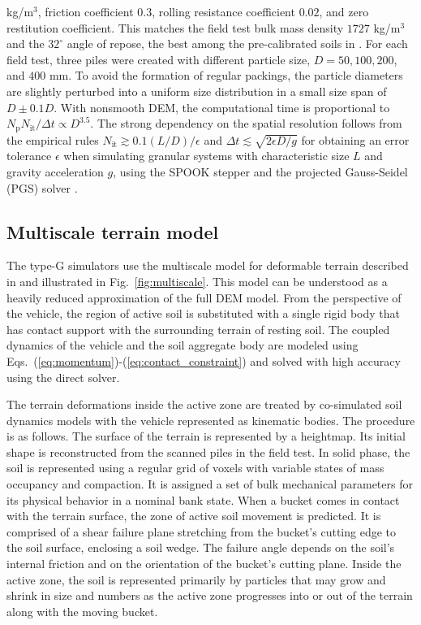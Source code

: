 \documentclass[10pt]{article}
\begin{document}
kg/m$^3$, friction coefficient $0.3$, rolling resistance coefficient $0.02$, and zero restitution coefficient. This matches the field test bulk mass density $1727$ kg/m$^3$ and the $32^{\circ}$ 
angle of repose, the best among the pre-calibrated soils in \cite{servin:2014:esn}.
For each field test, three piles were created with different particle size, $D = 50, 100, 200$, and $400$ mm.
To avoid the formation of regular packings, the particle diameters are slightly perturbed into
a uniform size distribution in a small size span of $D \pm 0.1D$. With nonsmooth DEM, the computational time 
is proportional to $N_\mathrm{p}N_\mathrm{it}/\Delta t \propto D^{3.5}$. The strong
dependency on the spatial resolution follows from the empirical rules 
$N_\mathrm{it} \gtrsim 0.1 (L/D)/\epsilon$ and $\Delta t \lesssim \sqrt{2\epsilon D/g}$ 
for obtaining an error tolerance $\epsilon$ when simulating granular systems with characteristic size $L$ and 
gravity acceleration $g$, using the SPOOK stepper and the projected Gauss-Seidel (PGS) solver \cite{servin:2014:esn}.

\subsection{Multiscale terrain model}
The type-G simulators use the multiscale model for deformable terrain described in 
\cite{Servin2021} and illustrated in Fig.~\ref{fig:multiscale}. 
This model can be understood as a heavily reduced approximation of the full DEM model. From the perspective of the vehicle, the region of active soil is substituted with a single rigid body that has contact support with the surrounding terrain of resting soil. 
The coupled dynamics of the vehicle and the soil aggregate body are modeled using Eqs.~(\ref{eq:momentum})-(\ref{eq:contact_constraint}) and solved with high accuracy using the direct solver.

The terrain deformations inside the active zone are treated by co-simulated soil dynamics models with the vehicle represented as kinematic bodies. The procedure is as follows. 
The surface of the terrain is represented by a heightmap. Its initial shape is reconstructed from the scanned piles in the field test. In solid phase, the soil
is represented using a regular grid of voxels with variable states of mass occupancy and 
compaction. It is assigned a set of bulk mechanical parameters for its physical
behavior in a nominal bank state. 
When a bucket comes in contact with the terrain surface, the zone of active soil 
movement is predicted. It is comprised of a shear failure plane stretching from the 
bucket's cutting edge to the soil surface, enclosing a soil wedge. The failure angle depends on the soil's internal 
friction and on the orientation of the bucket's cutting plane.
Inside the active zone, the soil is represented primarily by particles that may grow and 
shrink in size and numbers as the active zone progresses into or out of the terrain along with the moving bucket.
							 
\end{document}
